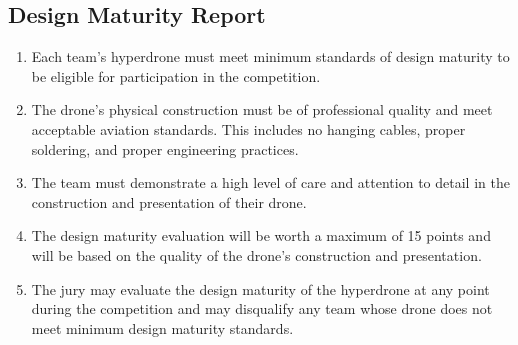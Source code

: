     \subsection{Design Maturity Report}
    \begin{enumerate}
    \item Each team's hyperdrone must meet minimum standards of design maturity to be eligible for participation in the competition.
    \item The drone's physical construction must be of professional quality and meet acceptable aviation standards. This includes no hanging cables, proper soldering, and proper engineering practices.
    \item The team must demonstrate a high level of care and attention to detail in the construction and presentation of their drone.
    \item The design maturity evaluation will be worth a maximum of 15 points and will be based on the quality of the drone's construction and presentation.
    \item The jury may evaluate the design maturity of the hyperdrone at any point during the competition and may disqualify any team whose drone does not meet minimum design maturity standards.
    \end{enumerate}
    
    
    
    
